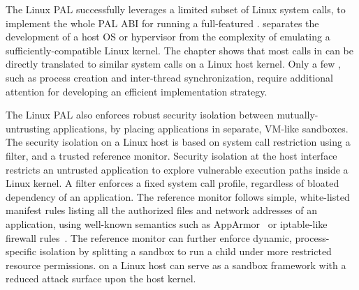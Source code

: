 


The Linux PAL successfully leverages a limited subset of Linux system calls,
to implement the whole PAL ABI for running a
full-featured \libos{}.
\Thehostabi{} separates the development of a host OS or hypervisor
from the complexity of emulating a sufficiently-compatible
Linux kernel.
The chapter shows that most calls in \thehostabi{}
can be directly translated to similar system calls on a Linux host kernel.
Only a few \hostapis{}, such as process creation and inter-thread synchronization, require additional attention for developing an efficient implementation strategy.



The Linux PAL also enforces robust security isolation
between mutually-untrusting applications,
by placing applications in separate, VM-like sandboxes.
The security isolation on a Linux host is based on system call restriction using a \seccomp{} filter, and a trusted reference monitor. %
Security isolation at the host interface
restricts an untrusted application to explore vulnerable execution paths
inside a Linux kernel.
A \seccomp{} filter 
enforces a fixed system call profile, regardless of bloated dependency of an application.
The reference monitor follows
simple, white-listed manifest rules listing 
all the authorized files and network addresses of an application,
using well-known semantics
such as AppArmor~\cite{apparmor} or iptable-like firewall rules~\cite{iptablesman}.
The reference monitor can further enforce dynamic, process-specific isolation by splitting a sandbox
to run a child \picoproc{} under more restricted
resource permissions.
\graphene{} on a Linux host can serve as a sandbox framework
with a reduced attack surface
upon the host kernel.






